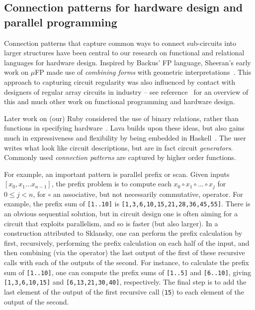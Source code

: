 \subsection{Connection patterns for hardware design and parallel programming}\label{sec:combinators}

Connection patterns that capture common ways to connect sub-circuits into larger structures have been central to our research on functional and relational languages for hardware design.
Inspired by Backus' FP language, Sheeran's early work on $\mu$FP made use of
{\em combining forms} with geometric interpretations~\cite{SheeranLFP84}. This approach
to capturing circuit regularity was also influenced by contact
with designers of regular array circuits in industry -- see reference~\cite{SheeranJUCS} for an overview of this and much other work on functional programming and hardware design.

Later work on (our) Ruby considered the use of binary relations, rather than functions in specifying hardware~\cite{LyngbyRuby}. Lava builds upon these ideas, but also gains much in expressiveness and flexibility by being embedded in Haskell~\cite{lavaICFP,ClaessenThesis}.
The user writes what look like circuit descriptions, but are in fact circuit {\em generators}. Commonly used {\em connection patterns} are captured by higher order functions.

For example, an important pattern is parallel prefix or scan. Given inputs $[x_0, x_1 \ldots x_{n-1}]$, the prefix problem is to compute each $x_0 \circ x_1 \circ \ldots \circ x_j$ for $0 \leq j < n$, for $\circ$ an associative, but not necessarily commutative, operator. For example, the prefix sum of {\tt [1..10]} is {\tt [1,3,6,10,15,21,28,36,45,55]}. There is an obvious sequential solution, but in circuit design one is often aiming for a circuit that exploits parallelism, and so is faster (but also larger). In a construction attributed to Sklansky, one can perform the prefix
calculation by first, recursively, performing the prefix calculation on 
each half of the input, and then combining (via the operator) the last output of the first of these
recursive calls with each of the outputs of the second.
For instance, to calculate the prefix sum of {\tt [1..10]}, one can compute the prefix
sums of {\tt [1..5]} and {\tt [6..10]}, giving {\tt [1,3,6,10,15]}
and {\tt [6,13,21,30,40]}, respectively. 
The final step is to add the last element of the output of the first recursive call ({\tt 15}) to each element of
the output of the second.

